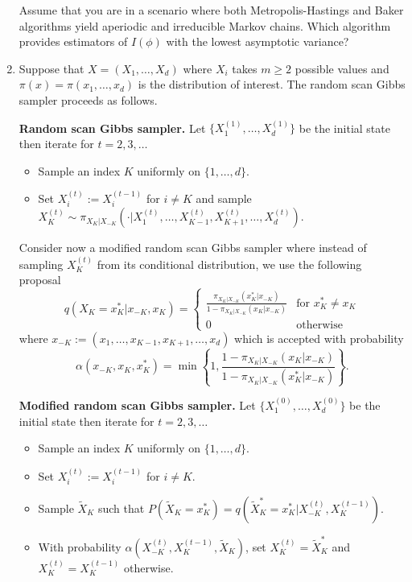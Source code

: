 \begin{enumerate}
Assume that you are in a scenario where both Metropolis-Hastings and Baker algorithms yield aperiodic and irreducible Markov chains. Which algorithm provides estimators of $I (\phi)$ with the lowest asymptotic variance?

\item Suppose that $X = (X_1, \ldots, X_d)$ where $X_i$ takes $m \geq 2$ possible values and $\pi (x) = \pi (x_1, \ldots, x_d)$ is the distribution of interest. The random scan Gibbs sampler proceeds as follows.

\textbf{Random scan Gibbs sampler.} Let $\{X_1^{(1)}, \ldots, X_d^{(1)}\}$ be the initial state then iterate for $t = 2, 3, \ldots$
\begin{itemize}
\item Sample an index $K$ uniformly on $\{1, \ldots, d\}$.
\item Set $X_i^{(t)} := X_i^{(t-1)}$ for $i \neq K$ and sample $X_K^{(t)} \sim \pi_{X_K|X_{-K}}\left(\cdot| X_1^{(t)}, \ldots, X_{K-1}^{(t)}, X_{K+1}^{(t)}, \ldots, X_d^{(t)}\right)$.
\end{itemize}

Consider now a modified random scan Gibbs sampler where instead of sampling $X_K^{(t)}$ from its conditional distribution, we use the following proposal
\begin{equation*}
q (X_K = x_K^*| x_{-K}, x_K) = \begin{cases}
\frac{\pi_{X_K|X_{-K}} (x_K^*|x_{-K})}{1-\pi_{X_K|X_{-K}} (x_K|x_{-K})} & \text{for } x_K^* \neq x_K \\
0 & \text{otherwise}
\end{cases}
\end{equation*}
where $x_{-K} := (x_1, \ldots, x_{K-1}, x_{K+1}, \ldots, x_d)$ which is accepted with probability
\begin{equation*}
\alpha (x_{-K}, x_K, x_K^*) = \min\left\{1,\frac{1 - \pi_{X_K|X_{-K}} (x_K| x_{-K})}{1 - \pi_{X_K|X_{-K}} (x_K^*| x_{-K})}\right\}.
\end{equation*}

\textbf{Modified random scan Gibbs sampler.} Let $\{X_1^{(0)}, \ldots, X_d^{(0)}\}$ be the initial state then iterate for $t = 2, 3, \ldots$
\begin{itemize}
\item Sample an index $K$ uniformly on $\{1, \ldots, d\}$.
\item Set $X_i^{(t)} := X_i^{(t-1)}$ for $i \neq K$.
\item Sample $\tilde{X}_K$ such that $P (\tilde{X}_K = x_K^*) = q\left(\tilde{X}_K^* = x_K^*| X_{-K}^{(t)}, X_K^{(t-1)}\right)$.
\item With probability $\alpha\left(X_{-K}^{(t)}, X_K^{(t-1)}, \tilde{X}_K\right)$, set $X_K^{(t)} = \tilde{X}_K^*$ and $X_K^{(t)} = X_K^{(t-1)}$ otherwise.
\end{itemize}


\end{enumerate}
